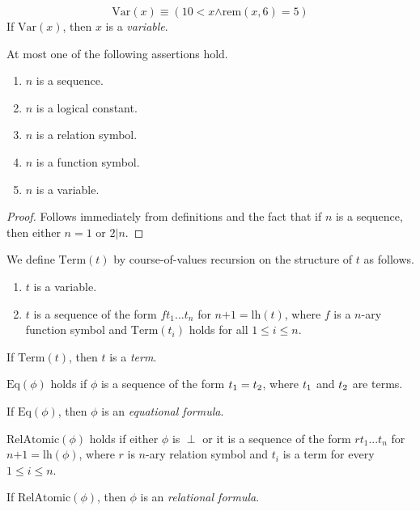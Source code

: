 \documentclass[10pt]{amsart}
\newcommand{\mand}{\boldsymbol{\wedge}}
\newcommand{\mle}{\boldsymbol{<}}
\newcommand{\mleq}{\boldsymbol{\leq}}
\newcommand{\meq}{\boldsymbol{=}}
\newcommand{\mplus}{\boldsymbol{+}}
\begin{document}
\begin{definition}
	$$\mathrm{Var}(x) \equiv \left(10 \mle x \mand \mathrm{rem}(x,6) \meq 5\right)$$
	If $\mathrm{Var}(x)$, then $x$ is a \textit{variable}.
\end{definition}

\begin{fact}\label{fact:signature_variables_parentheses_logical_symbols_and_sequences_are_pairwise_disjoint}
	At most one of the following assertions hold.
	\begin{enumerate}[label=\emph{\textbf{(\arabic*)}}, leftmargin=3.0em]
		\item $n$ is a sequence.
		\item $n$ is a logical constant.
		\item $n$ is a relation symbol.
		\item $n$ is a function symbol.
		\item $n$ is a variable.
	\end{enumerate}
\end{fact}
\begin{proof}
	Follows immediately from definitions and the fact that if $n$ is a sequence, then either $n \meq 1$ or $2|n$.
\end{proof}

\begin{definition}
	We define $\mathrm{Term}(t)$ by course-of-values recursion on the structure of $t$ as follows.
  \begin{enumerate}[label=\textbf{(\arabic*)}, leftmargin=3.0em]
    \item $t$ is a variable.
    \item $t$ is a sequence of the form $ft_1...t_n$ for $n \mplus 1 = \mathrm{lh}(t)$, where $f$ is a $n$-ary function symbol and $\mathrm{Term}(t_i)$ holds for all $1 \mleq i \mleq n$.
  \end{enumerate}
  If $\mathrm{Term}(t)$, then $t$ is a \textit{term}.
\end{definition}

\begin{definition}
  $\mathrm{Eq}(\phi)$ holds if $\phi$ is a sequence of the form $t_{\rm{1}}= t_{\rm{2}}$, where $t_{\rm{1}}$ and $t_{\rm{2}}$ are terms.
	
  If $\mathrm{Eq}(\phi)$, then $\phi$ is an \textit{equational formula}.
\end{definition}

\begin{definition}
  $\mathrm{RelAtomic}(\phi)$ holds if either $\phi$ is $\perp$ or it is a sequence of the form $rt_1...t_n$ for $n \mplus 1 = \mathrm{lh}(\phi)$, where $r$ is $n$-ary relation symbol and $t_i$ is a term for every $1 \mleq i \mleq n$.

  If $\mathrm{RelAtomic}(\phi)$, then $\phi$ is an \textit{relational formula}.
\end{definition}
\end{document}
